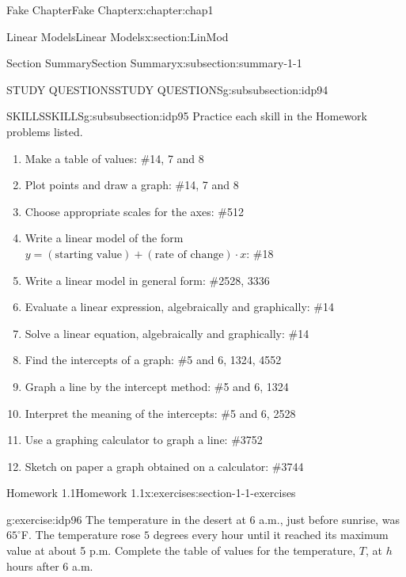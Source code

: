 \documentclass[oneside,10pt,]{book}
\numberwithin{equation}{section}
\newcommand\degree[0]{^{\circ}}
\begin{document}
\begin{chapterptx}{Fake Chapter}{}{Fake Chapter}{}{}{x:chapter:chap1}
\begin{sectionptx}{Linear Models}{}{Linear Models}{}{}{x:section:LinMod}
\begin{subsectionptx}{Section Summary}{}{Section Summary}{}{}{x:subsection:summary-1-1}
\begin{subsubsectionptx}{STUDY QUESTIONS}{}{STUDY QUESTIONS}{}{}{g:subsubsection:idp94}
%
\end{subsubsectionptx}
%
%
\typeout{************************************************}
\typeout{************************************************}
%
\begin{subsubsectionptx}{SKILLS}{}{SKILLS}{}{}{g:subsubsection:idp95}
Practice each skill in the Homework problems listed.%
\begin{enumerate}[label=\arabic*]
\item{}Make a table of values: \#1\textendash{}4, 7 and 8%
\item{}Plot points and draw a graph: \#1\textendash{}4, 7 and 8%
\item{}Choose appropriate scales for the axes: \#5\textendash{}12%
\item{}Write a linear model of the form \(y = (\text{starting value}) + (\text{rate of change})\cdot x\): \#1\textendash{}8%
\item{}Write a linear model in general form: \#25\textendash{}28, 33\textendash{}36%
\item{}Evaluate a linear expression, algebraically and graphically: \#1\textendash{}4%
\item{}Solve a linear equation, algebraically and graphically: \#1\textendash{}4%
\item{}Find the intercepts of a graph: \#5 and 6, 13\textendash{}24, 45\textendash{}52%
\item{}Graph a line by the intercept method: \#5 and 6, 13\textendash{}24%
\item{}Interpret the meaning of the intercepts: \#5 and 6, 25\textendash{}28%
\item{}Use a graphing calculator to graph a line: \#37\textendash{}52%
\item{}Sketch on paper a graph obtained on a calculator: \#37\textendash{}44%
\end{enumerate}
%
\end{subsubsectionptx}
\end{subsectionptx}
%
%
\typeout{************************************************}
\typeout{************************************************}
%
\begin{exercises-subsection}{Homework 1.1}{}{Homework 1.1}{}{}{x:exercises:section-1-1-exercises}
\begin{divisionexercise}{1}{}{}{g:exercise:idp96}%
The temperature in the desert at 6 a.m., just before sunrise, was \(65\degree\)F. The temperature rose \(5\) degrees every hour until it reached its maximum value at about 5 p.m. Complete the table of values for the temperature, \(T\), at \(h\) hours after 6 a.m.%

\end{divisionexercise}
\end{exercises-subsection}
\end{sectionptx}
\end{chapterptx}
\end{document}
